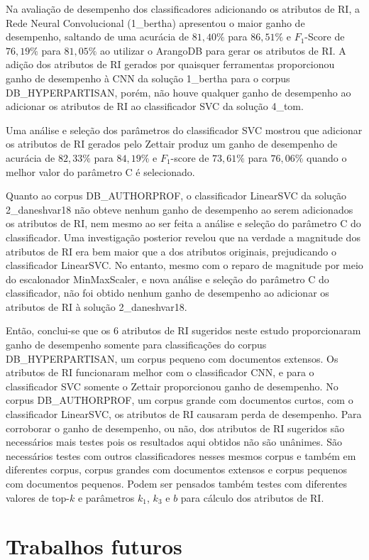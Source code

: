 Na avaliação de desempenho dos classificadores adicionando os atributos de RI, a Rede Neural Convolucional (1\_bertha) apresentou o maior ganho de desempenho, saltando de uma acurácia de $81,40\%$ para $86,51\%$ e $F_1$-Score de $76,19\%$ para $81,05\%$ ao utilizar o ArangoDB para gerar os atributos de RI.
A adição dos atributos de RI gerados por quaisquer ferramentas proporcionou ganho de desempenho à CNN da solução 1\_bertha para o corpus DB\_HYPERPARTISAN, porém, não houve qualquer ganho de desempenho ao adicionar os atributos de RI ao classificador SVC da solução 4\_tom.

Uma análise e seleção dos parâmetros do classificador SVC mostrou que adicionar os atributos de RI gerados pelo Zettair produz um ganho de desempenho de acurácia de $82,33\%$ para $84,19\%$ e $F_1$-score de $73,61\%$ para $76,06\%$ quando o melhor valor do parâmetro C é selecionado.

Quanto ao corpus DB\_AUTHORPROF, o classificador LinearSVC da solução 2\_daneshvar18 não obteve nenhum ganho de desempenho ao serem adicionados os atributos de RI, nem mesmo ao ser feita a análise e seleção do parâmetro C do classificador.
Uma investigação posterior revelou que na verdade a magnitude dos atributos de RI era bem maior que a dos atributos originais, prejudicando o classificador LinearSVC.
No entanto, mesmo com o reparo de magnitude por meio do escalonador MinMaxScaler, e nova análise e seleção do parâmetro C do classificador, não foi obtido nenhum ganho de desempenho ao adicionar os atributos de RI à solução 2\_daneshvar18.

Então, conclui-se que os 6 atributos de RI sugeridos neste estudo proporcionaram ganho de desempenho somente para classificações do corpus DB\_HYPERPARTISAN, um corpus pequeno com documentos extensos.
Os atributos de RI funcionaram melhor com o classificador CNN, e para o classificador SVC somente o Zettair proporcionou ganho de desempenho.
No corpus DB\_AUTHORPROF, um corpus grande com documentos curtos, com o classificador LinearSVC, os atributos de RI causaram perda de desempenho.
Para corroborar o ganho de desempenho, ou não, dos atributos de RI sugeridos são necessários mais testes pois os resultados aqui obtidos não são unânimes.
São necessários testes com outros classificadores nesses mesmos corpus e também em diferentes corpus, corpus grandes com documentos extensos e corpus pequenos com documentos pequenos. 
Podem ser pensados também testes com diferentes valores de top-$k$ e parâmetros $k_1$, $k_3$ e $b$ para cálculo dos atributos de RI.


% 
\section{Trabalhos futuros}

